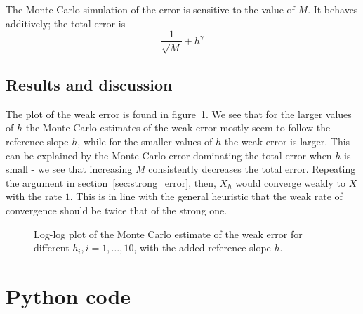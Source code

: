 \documentclass[11pt, a4paper]{article}
\begin{document}
The Monte Carlo simulation of the error is sensitive to the value of $M$.
It behaves additively; the total error is
$$ \frac1{\sqrt M} + h^\gamma $$
\subsection{Results and discussion}
The plot of the weak error is found in figure~\ref{fig:weak_error}.
We see that for the larger values of $h$ the Monte Carlo estimates
of the weak error mostly seem to follow the reference slope $h$,
while for the smaller values of $h$ the weak error is larger.
This can be explained by the Monte Carlo error dominating the total error
when $h$ is small -
we see that increasing $M$ consistently decreases the total error.
Repeating the argument in section~\ref{sec:strong_error}, then,
$X_h$ would converge weakly to $X$ with the rate $1$.
This is in line with the general heuristic that
the weak rate of convergence should be twice that of the strong one.

\begin{figure}
	\centering
	
	\caption{Log-log plot of the Monte Carlo estimate of the weak error for different $h_i, i = 1, \ldots, 10$,
	with the added reference slope $h$. \label{fig:weak_error}}
\end{figure}

\clearpage
\appendix %

\section{Python code}

\end{document}
